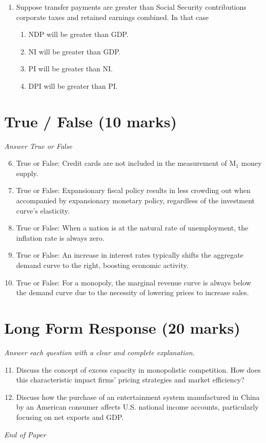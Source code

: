 \documentclass[12pt]{article}
\begin{document}
\begin{enumerate}[label=\arabic*.]
\begin{enumerate}[label=(\alph*)]
    \item Increasing marginal utility.
    \item Increasing marginal productivity.
\end{enumerate}
\item Suppose transfer payments are greater than Social Security contributions corporate taxes and retained earnings combined. In that case
\begin{enumerate}[label=(\alph*)]
    \item NDP will be greater than GDP.
    \item NI will be greater than GDP.
    \item PI will be greater than NI.
    \item DPI will be greater than PI.
\end{enumerate}
\end{enumerate}

\section*{True / False (10 marks)}
\textit{Answer True or False}
\begin{enumerate}[label=\arabic*.]
\setcounter{enumi}{5}
\item True or False: Credit cards are not included in the measurement of M$_{1}$ money supply.
\item True or False: Expansionary fiscal policy results in less crowding out when accompanied by expansionary monetary policy, regardless of the investment curve's elasticity.
\item True or False: When a nation is at the natural rate of unemployment, the inflation rate is always zero.
\item True or False: An increase in interest rates typically shifts the aggregate demand curve to the right, boosting economic activity.
\item True or False: For a monopoly, the marginal revenue curve is always below the demand curve due to the necessity of lowering prices to increase sales.
\end{enumerate}

\section*{Long Form Response (20 marks)}
\textit{Answer each question with a clear and complete explanation.}
\begin{enumerate}[label=\arabic*.]
\setcounter{enumi}{10}
\item Discuss the concept of excess capacity in monopolistic competition. How does this characteristic impact firms' pricing strategies and market efficiency?
\item Discuss how the purchase of an entertainment system manufactured in China by an American consumer affects U.S. national income accounts, particularly focusing on net exports and GDP.
\end{enumerate}

\vfill
\noindent\textit{End of Paper}
\end{document}
